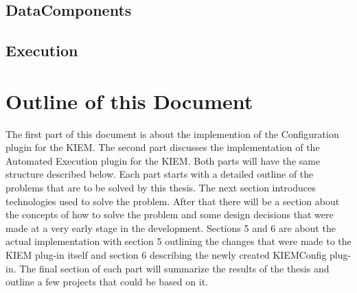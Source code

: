 \subsection{DataComponents}
\label{section:IntroDataComponent}

\subsection{Execution}
\label{section:IntroExecution}



\section{Outline of this Document}
\label{sec:intro/Outline}
The first part of this document is about the implemention of the Configuration plugin for the \ac{KIEM}.
The second part discusses the implementation of the Automated Execution plugin for the \ac{KIEM}. Both
parts will have the same structure described below.
Each part starts with a detailed outline of the problems that are to be solved by this thesis.
The next section introduces technologies used to solve the problem.
After that there will be a section about the concepts of how to solve the problem and some
design decisions that were made at a very early stage in the development.
Sections 5 and 6 are about the actual implementation with section 5 outlining the changes
that were made to the \ac{KIEM} plug-in itself and section 6 describing the newly created
\ac{KIEMConfig} plug-in.
The final section of each part will summarize the results of the thesis and outline
a few projects that could be based on it.








